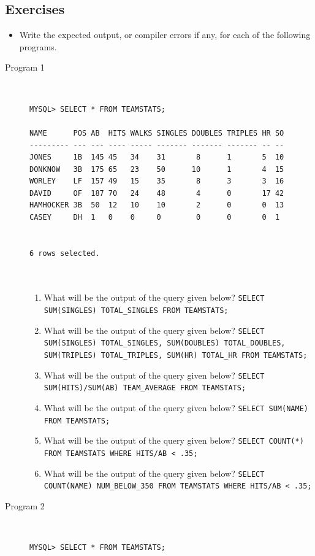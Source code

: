 \documentclass[11pt,a4paper]{article}
\def\AnswerBox{\fbox{\begin{minipage}{4in}\hfill\vspace{0.5in}\end{minipage}}}
\begin{document}
\subsection*{Exercises}
\begin{itemize}
\item Write the expected output, or compiler errors if any, for each of the following programs.
\end{itemize}
\begin{description}
\item[Program 1]\
\begin{verbatim}
MYSQL> SELECT * FROM TEAMSTATS;

NAME      POS AB  HITS WALKS SINGLES DOUBLES TRIPLES HR SO
--------- --- --- ---- ----- ------- ------- ------- -- --
JONES     1B  145 45   34    31       8      1       5  10
DONKNOW   3B  175 65   23    50      10      1       4  15
WORLEY    LF  157 49   15    35       8      3       3  16
DAVID     OF  187 70   24    48       4      0       17 42
HAMHOCKER 3B  50  12   10    10       2      0       0  13
CASEY     DH  1   0    0     0        0      0       0  1


6 rows selected.



\end{verbatim}



\begin{enumerate}[label=\bfseries Q\arabic*:]\itemsep10pt
\item What will be the output  of the query given below?\newline
\texttt{SELECT SUM(SINGLES) TOTAL\_SINGLES FROM TEAMSTATS;}
\item What will be the output of the query given below?\newline
\texttt{SELECT SUM(SINGLES) TOTAL\_SINGLES, SUM(DOUBLES) TOTAL\_DOUBLES, SUM(TRIPLES) TOTAL\_TRIPLES, 
SUM(HR) TOTAL\_HR FROM TEAMSTATS;}
\item What will be the output of the query given below?\newline
\texttt{SELECT SUM(HITS)/SUM(AB) TEAM\_AVERAGE FROM TEAMSTATS;}
\item What will be the output of the query given below?
\texttt{SELECT SUM(NAME) FROM TEAMSTATS;}
\item What will be the output of the query given below?\newline
\texttt{SELECT COUNT(*) FROM TEAMSTATS WHERE HITS/AB < .35;}
\item What will be the output of the query given below?\newline
\texttt{SELECT COUNT(NAME) NUM\_BELOW\_350 FROM TEAMSTATS WHERE HITS/AB < .35;}
\end{enumerate}
\newpage
\item[Program 2]\
\begin{verbatim}
MYSQL> SELECT * FROM TEAMSTATS;


\end{verbatim}
\end{description}
\end{document}
